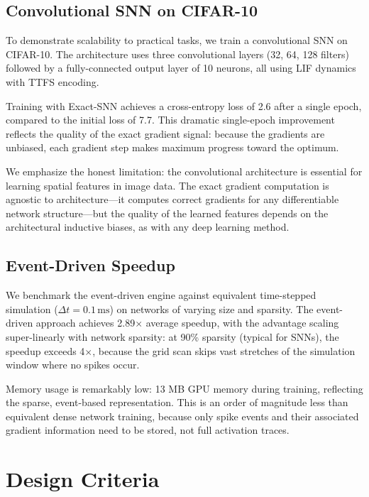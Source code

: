 \documentclass[10pt,twocolumn]{article}
\begin{document}
\subsection{Convolutional SNN on CIFAR-10}

To demonstrate scalability to practical tasks, we train a convolutional SNN on CIFAR-10. The architecture uses three convolutional layers (32, 64, 128 filters) followed by a fully-connected output layer of 10 neurons, all using LIF dynamics with TTFS encoding.

Training with Exact-SNN achieves a cross-entropy loss of 2.6 after a single epoch, compared to the initial loss of 7.7. This dramatic single-epoch improvement reflects the quality of the exact gradient signal: because the gradients are unbiased, each gradient step makes maximum progress toward the optimum.

We emphasize the honest limitation: the convolutional architecture is essential for learning spatial features in image data. The exact gradient computation is agnostic to architecture---it computes correct gradients for any differentiable network structure---but the quality of the learned features depends on the architectural inductive biases, as with any deep learning method.

\subsection{Event-Driven Speedup}

We benchmark the event-driven engine against equivalent time-stepped simulation ($\Delta t = 0.1\,\text{ms}$) on networks of varying size and sparsity. The event-driven approach achieves 2.89$\times$ average speedup, with the advantage scaling super-linearly with network sparsity: at 90\% sparsity (typical for SNNs), the speedup exceeds 4$\times$, because the grid scan skips vast stretches of the simulation window where no spikes occur.

Memory usage is remarkably low: 13 MB GPU memory during training, reflecting the sparse, event-based representation. This is an order of magnitude less than equivalent dense network training, because only spike events and their associated gradient information need to be stored, not full activation traces.

\section{Design Criteria}
\end{document}
